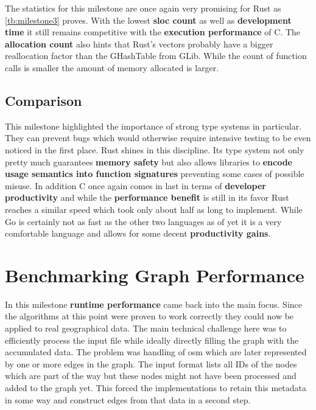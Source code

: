 The statistics for this milestone are once again very promising for Rust as \autoref{tb:milestone3} proves. With the lowest \textbf{\gls{sloc} count} as well as \textbf{development time} it still remains competitive with the \textbf{execution performance} of C. The \textbf{allocation count} also hints that Rust's vectors probably have a bigger reallocation factor than the GHashTable from GLib. While the count of function calls is smaller the amount of memory allocated is larger.

\subsection{Comparison}
\label{subsec:Implementation::Verification::Comparison}

This milestone highlighted the importance of strong type systems in particular. They can prevent bugs which would otherwise require intensive testing to be even noticed in the first place. Rust shines in this discipline. Its type system not only pretty much guarantees \textbf{memory safety} but also allows libraries to \textbf{encode usage semantics into function signatures} preventing some cases of possible misuse. In addition C once again comes in last in terms of \textbf{developer productivity} and while the \textbf{performance benefit} is still in its favor Rust reaches a similar speed which took only about half as long to implement. While Go is certainly not as fast as the other two languages as of yet it is a very comfortable language and allows for some decent \textbf{productivity gains}.

\section{Benchmarking Graph Performance}
\label{sec:Implementation::SequentialBenchmark}

In this milestone \textbf{runtime performance} came back into the main focus. Since the algorithms at this point were proven to work correctly they could now be applied to real geographical data. The main technical challenge here was to efficiently process the input file while ideally directly filling the graph with the accumulated data. The problem was handling of \gls{osm}  which are later represented by one or more edges in the graph. The input format lists all IDs of the nodes which are part of the way but these nodes might not have been processed and added to the graph yet. This forced the implementations to retain this metadata in some way and construct edges from that data in a second step.

